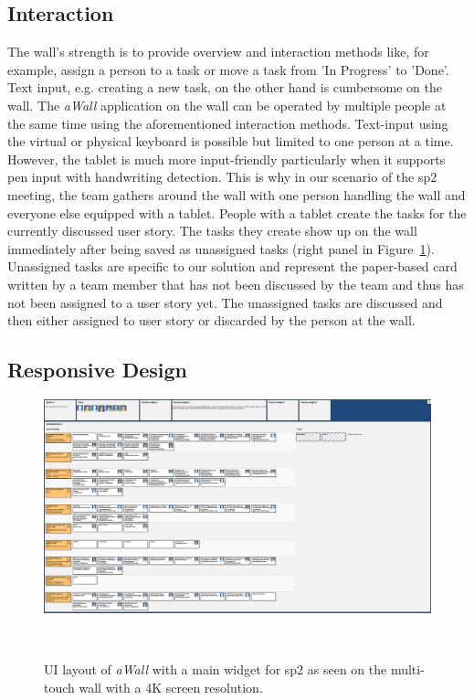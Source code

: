 \documentclass{sigchi}
\begin{document}
\subsection{Interaction}

The wall's strength is to provide overview and interaction methods like, for example, assign a person to a task or move a task from 'In Progress' to 'Done'. 
Text input, e.g. creating a new task, on the other hand is cumbersome on the wall. 
The \textit{aWall} application on the wall can be operated by multiple people at the same time using the aforementioned interaction methods.
Text-input using the virtual or physical keyboard is possible but limited to one person at a time.
However, the tablet is much more input-friendly particularly when it supports pen input with handwriting detection.
This is why in our scenario of the \gls{sp2} meeting, the team gathers around the wall with one person handling the wall and everyone else equipped with a tablet.
People with a tablet create the tasks for the currently discussed user story.
The tasks they create show up on the wall immediately after being saved as unassigned tasks (right panel in Figure~\ref{fig:awall-layout}).
Unassigned tasks are specific to our solution and represent the paper-based card written by a team member that has not been discussed by the team and thus has not been assigned to a user story yet.
The unassigned tasks are discussed and then either assigned to user story or discarded by the person at the wall.


\subsection{Responsive Design}

\begin{figure}
	\centering
	\includegraphics[width=\columnwidth]{figures/awall-layout}
	\caption{UI layout of \textit{aWall} with a main widget for \gls{sp2} as seen on the multi-touch wall with a 4K screen resolution.}~\label{fig:awall-layout}
\end{figure}
\end{document}
